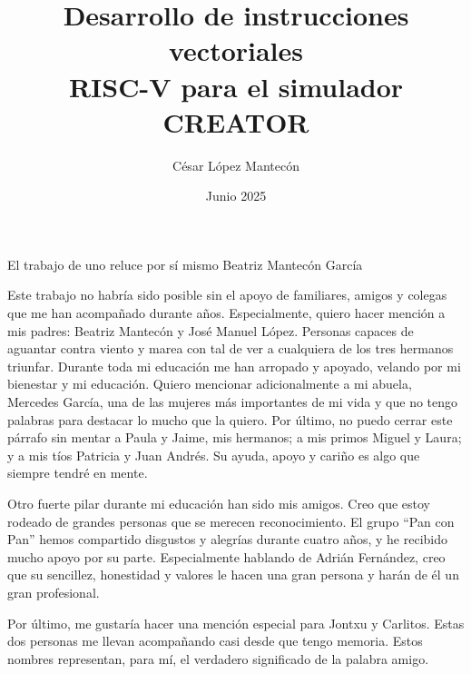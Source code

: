 \documentclass[es]{uc3mthesisIEEE}
\title{Desarrollo de instrucciones vectoriales\\ \vspace{0.3cm} RISC-V para el simulador CREATOR}
\author{César López Mantecón}
\date{Junio 2025}
\begin{document}
  \makecover


  \makeepigraph
    {El trabajo de uno reluce por sí mismo}  %
    {Beatriz Mantecón García}  %
    {}  %


  \begin{acknowledgements}
      Este trabajo no habría sido posible sin el apoyo de familiares, amigos y colegas que me han acompañado durante años. Especialmente, quiero hacer mención a mis padres: Beatriz Mantecón y José Manuel López. Personas capaces de aguantar contra viento y marea con tal de ver a cualquiera de los tres hermanos triunfar. Durante toda mi educación me han arropado y apoyado, velando por mi bienestar y mi educación. Quiero mencionar adicionalmente a mi abuela, Mercedes García, una de las mujeres más importantes de mi vida y que no tengo palabras para destacar lo mucho que la quiero. Por último, no puedo cerrar este párrafo sin mentar a Paula y Jaime, mis hermanos; a mis primos Miguel y Laura; y a mis tíos Patricia y Juan Andrés. Su ayuda, apoyo y cariño es algo que siempre tendré en mente.

      Otro fuerte pilar durante mi educación han sido mis amigos. Creo que estoy rodeado de grandes personas que se merecen reconocimiento. El grupo ``Pan con Pan'' hemos compartido disgustos y alegrías durante cuatro años, y he recibido mucho apoyo por su parte. Especialmente hablando de Adrián Fernández, creo que su sencillez, honestidad y valores le hacen una gran persona y harán de él un gran profesional.

      Por último, me gustaría hacer una mención especial para Jontxu y Carlitos. Estas dos personas me llevan acompañando casi desde que tengo memoria. Estos nombres representan, para mí, el verdadero significado de la palabra amigo.

  \end{acknowledgements}
\end{document}
